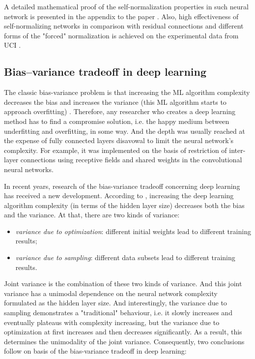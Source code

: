 \documentclass{article}
\begin{document}
A detailed mathematical proof of the self-normalization properties in such neural network is presented in the appendix to the paper \cite{Klambauer2017}. Also, high effectiveness of self-normalizing networks in comparison with residual connections and different forms of the "forced" normalization is achieved on the experimental data from UCI \cite{dua2019}.

\subsection{Bias–variance tradeoff in deep learning}

The classic bias-variance problem is that increasing the ML algorithm complexity decreases the bias and increases the variance (this ML algorithm starts to approach overfitting) \cite{geman1992}. Therefore, any researcher who creates a deep learning method has to find a compromise solution, i.e. the happy medium between underfitting and overfitting, in some way. And the depth was usually reached at the expense of fully connected layers disavowal to limit the neural network's complexity. For example, it was implemented on the basis of restriction of inter-layer connections using receptive fields and shared weights in the convolutional neural networks.

In recent years, research of the bias-variance tradeoff concerning deep learning has received a new development. According to \cite{Neal2019}, increasing the deep learning algorithm complexity (in terms of the hidden layer size) decreases both the bias and the variance. At that, there are two kinds of variance:

\begin{itemize}
    \item \textit{variance due to optimization}: different initial weights lead to different training results;
    \item \textit{variance due to sampling}: different data subsets lead to different training results.
\end{itemize}

Joint variance is the combination of these two kinds of variance. And this joint variance has a unimodal dependence on the neural network complexity formulated as the hidden layer size. And interestingly, the variance due to sampling demonstrates a "traditional" behaviour, i.e. it slowly increases and eventually plateaus with complexity increasing, but the variance due to optimization at first increases and then decreases significantly. As a result, this determines the unimodality of the joint variance. Consequently, two conclusions follow on basis of the bias-variance tradeoff in deep learning:
\end{document}
